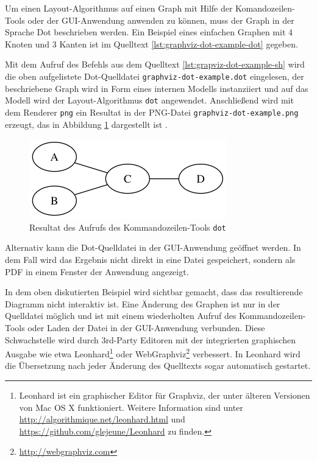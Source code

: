 
Um einen Layout-Algorithmus auf einen Graph mit Hilfe der Komandozeilen-Tools oder der GUI-Anwendung anwenden zu können, muss der Graph in der Sprache Dot beschrieben werden. Ein Beispiel eines einfachen Graphen mit 4 Knoten und 3 Kanten ist im Quelltext \ref{lst:graphviz-dot-example-dot} gegeben.



Mit dem Aufruf des Befehls aus dem Quelltext \ref{lst:grapviz-dot-example-sh} wird die oben aufgelistete Dot-Quelldatei \lstinline{graphviz-dot-example.dot} eingelesen, der beschriebene Graph wird in Form eines internen Modells instanziiert und auf das Modell wird der Layout-Algorithmus \lstinline{dot} angewendet. Anschließend wird mit dem Renderer \lstinline{png} ein Resultat in der PNG-Datei \lstinline{graphviz-dot-example.png} erzeugt, das in Abbildung \ref{fig:graphviz-dot-example} dargestellt ist \cite{Gansner14Using}.



\begin{figure}[hbt]
    \centering
    \includegraphics[scale=0.75]{resources/graphviz-dot-example.png}
    \caption{Resultat des Aufrufs des Kommandozeilen-Tools \lstinline{dot}}
    \label{fig:graphviz-dot-example}
\end{figure}

Alternativ kann die Dot-Quelldatei in der GUI-Anwendung geöffnet werden. In dem Fall wird das Ergebnis nicht direkt in eine Datei gespeichert, sondern als PDF in einem Fenster der Anwendung angezeigt.

In dem oben diskutierten Beispiel wird sichtbar gemacht, dass das resultierende Diagramm nicht interaktiv ist. Eine Änderung des Graphen ist nur in der Quelldatei möglich und ist mit einem wiederholten Aufruf des Kommandozeilen-Tools oder Laden der Datei in der GUI-Anwendung verbunden. Diese Schwachstelle wird durch 3rd-Party Editoren mit der integrierten graphischen Ausgabe wie etwa Leonhard\footnote{Leonhard ist ein graphischer Editor für Graphviz, der unter älteren Versionen von Mac OS X funktioniert. Weitere Information sind unter \url{http://algorithmique.net/leonhard.html} und \url{https://github.com/glejeune/Leonhard} zu finden.} oder WebGraphviz\footnote{\url{http://webgraphviz.com}} verbessert. In Leonhard wird die Übersetzung nach jeder Änderung des Quelltexts sogar automatisch gestartet.

